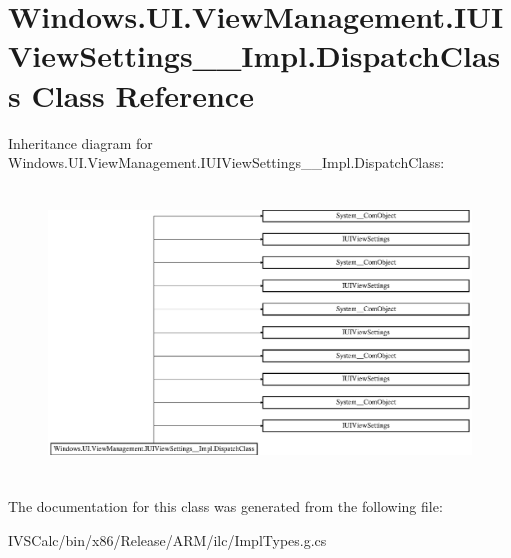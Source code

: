 \hypertarget{class_windows_1_1_u_i_1_1_view_management_1_1_i_u_i_view_settings_____impl_1_1_dispatch_class}{}\section{Windows.\+U\+I.\+View\+Management.\+I\+U\+I\+View\+Settings\+\_\+\+\_\+\+Impl.\+Dispatch\+Class Class Reference}
\label{class_windows_1_1_u_i_1_1_view_management_1_1_i_u_i_view_settings_____impl_1_1_dispatch_class}
Inheritance diagram for Windows.\+U\+I.\+View\+Management.\+I\+U\+I\+View\+Settings\+\_\+\+\_\+\+Impl.\+Dispatch\+Class\+:\begin{figure}[H]
\begin{center}
\leavevmode
\includegraphics[height=7.719297cm]{class_windows_1_1_u_i_1_1_view_management_1_1_i_u_i_view_settings_____impl_1_1_dispatch_class}
\end{center}
\end{figure}


The documentation for this class was generated from the following file\+:\begin{DoxyCompactItemize}
\item 
I\+V\+S\+Calc/bin/x86/\+Release/\+A\+R\+M/ilc/Impl\+Types.\+g.\+cs\end{DoxyCompactItemize}
